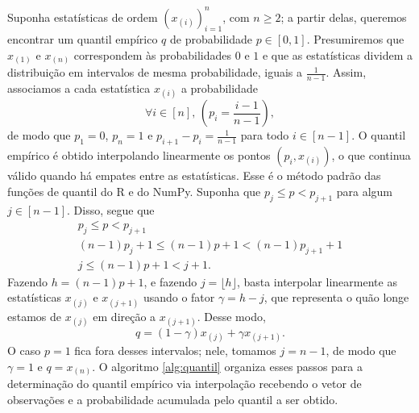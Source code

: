 Suponha estatísticas de ordem $(x_{(i)})_{i=1}^n$, com $n \ge 2$; a partir delas,
queremos encontrar um quantil empírico $q$ de probabilidade $p \in [0, 1]$.
Presumiremos que $x_{(1)}$ e $x_{(n)}$ correspondem às probabilidades $0$ e $1$ e que as
estatísticas dividem a distribuição em intervalos de mesma probabilidade, iguais a
$\frac{1}{n-1}$.
Assim, associamos a cada estatística $x_{(i)}$ a probabilidade
\[
    \forall i \in [n],\, \left(p_i = \frac{i-1}{n-1}\right),
\]
de modo que $p_1 = 0$, $p_n = 1$ e $p_{i+1} - p_i = \frac{1}{n-1}$ para todo $i \in [n-1]$.
O quantil empírico é obtido interpolando linearmente os pontos $(p_i, x_{(i)})$, o que
continua válido quando há empates entre as estatísticas.
Esse é o método padrão das funções de quantil do R e do NumPy.
Suponha que $p_j \le p < p_{j+1}$ para algum $j \in [n-1]$.
Disso, segue que
\begin{gather*}
    p_j \le p < p_{j+1} \\
    (n-1)p_j + 1 \le (n-1)p + 1 < (n-1)p_{j+1} + 1 \\
    j \le (n-1)p + 1 < j+1.
\end{gather*}
Fazendo $h = (n-1)p + 1$, e fazendo $j = \lfloor{h}\rfloor$, basta interpolar linearmente
as estatísticas $x_{(j)}$ e $x_{(j+1)}$ usando o fator $\gamma = h - j$, que representa o
quão longe estamos de $x_{(j)}$ em direção a $x_{(j+1)}$.
Desse modo,
\[
    q = (1 - \gamma) x_{(j)}+ \gamma x_{(j+1)}.
\]
O caso $p = 1$ fica fora desses intervalos; nele, tomamos $j = n-1$, de modo que
$\gamma = 1$ e $q = x_{(n)}$.
O algoritmo \ref{alg:quantil} organiza esses passos para a determinação do quantil
empírico via interpolação recebendo o vetor de observações e a probabilidade acumulada
pelo quantil a ser obtido.

\begin{algorithm}
\SetAlgoLined
{}
\caption{Método de Interpolação do Quantil Empírico}
\label{alg:quantil}
\end{algorithm}

